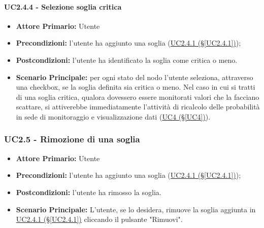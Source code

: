 \paragraph{UC2.4.4 - Selezione soglia critica}\label{UC2.4.4}
\begin{itemize}
	\item \textbf{Attore Primario:} Utente
	\item \textbf{Precondizioni:} l'utente ha aggiunto una soglia (\hyperref[UC2.4.1]{UC2.4.1 (§\ref*{UC2.4.1})});
	\item \textbf{Postcondizioni:} l'utente ha identificato la soglia come critica o meno.
	\item \textbf{Scenario Principale:} per ogni stato del nodo l'utente seleziona, attraverso una checkbox, se la soglia definita sia critica o meno. Nel caso in cui si tratti di una soglia critica, qualora dovessero essere monitorati valori che la facciano scattare, si attiverebbe immediatamente l'attività di ricalcolo delle probabilità in sede di monitoraggio e visualizzazione dati (\hyperref[UC4]{UC4 (§\ref*{UC4})}).
\end{itemize}

\pagebreak

\subsubsection{UC2.5 - Rimozione di una soglia}\label{UC2.5}
\begin{itemize}
	\item \textbf{Attore Primario:} Utente
	\item \textbf{Precondizioni:} l'utente ha aggiunto una soglia (\hyperref[UC2.4.1]{UC2.4.1 (§\ref*{UC2.4.1})});
	\item \textbf{Postcondizioni:} l'utente ha rimosso la soglia.
	\item \textbf{Scenario Principale:} L'utente, se lo desidera, rimuove la soglia aggiunta in \hyperref[UC2.4.1]{UC2.4.1 (§\ref*{UC2.4.1})} cliccando il pulsante "Rimuovi".
\end{itemize}

